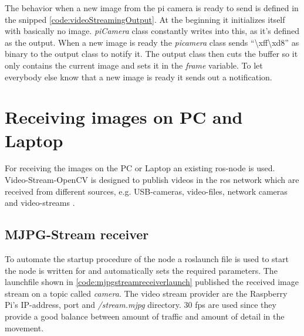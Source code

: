 The behavior when a new image from the pi camera is ready to send is defined in the snipped \ref{code:videoStreamingOutput}. At the beginning it initializes itself with basically no image. \textit{piCamera} class constantly writes into this, as it's defined as the output. When a new image is ready the \textit{picamera} class sends \enquote{\textbackslash xff\textbackslash xd8} as binary to the output class to notify it. The output class then cuts the buffer so it only contains the current image and sets it in the \textit{frame} variable. To let everybody else know that a new image is ready it sends out a notification.



\section{Receiving images on PC and Laptop\authorA}
For receiving the images on the PC or Laptop an existing \gls{ros}-node is used. Video-Stream-OpenCV is designed to publish videos in the \gls{ros} network which are received from different sources, e.g. USB-cameras, video-files, network cameras and video-streams \cite{videostreamopencv}.

\subsection{MJPG-Stream receiver}
To automate the startup procedure of the node a roslaunch file is used to start the node is written for and automatically sets the required parameters.\newline
The launchfile shown in \ref{code:mjpgstreamreceiverlaunch} published the received image stream on a topic called \textit{camera}. The video stream provider are the Raspberry Pi's IP-address, port and \textit{/stream.mjpg} directory. 30 \gls{fps} are used since they provide a good balance between amount of traffic and amount of detail in the movement.



